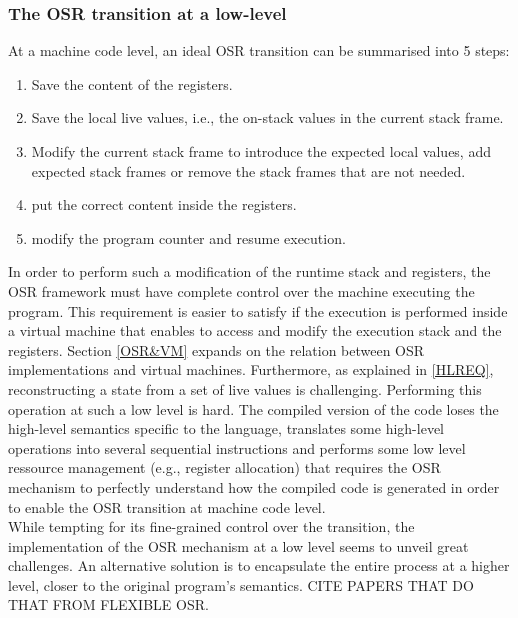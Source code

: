 \subsubsection{The OSR transition at a low-level}
At a machine code level, an ideal OSR transition can be summarised into 5 steps: 
\begin{enumerate}
    \item Save the content of the registers.
    \item Save the local live values, i.e., the on-stack values in the current stack frame.
    \item Modify the current stack frame to introduce the expected local values, add expected stack frames or remove the stack frames that are not needed.
    \item put the correct content inside the registers.
    \item modify the program counter and resume execution.
\end{enumerate}
In order to perform such a modification of the runtime stack and registers, the OSR framework must have complete control over the machine executing the program.
This requirement is easier to satisfy if the execution is performed inside a virtual machine that enables to access and modify the execution stack and the registers.
Section \ref{OSR&VM} expands on the relation between OSR implementations and virtual machines.
Furthermore, as explained in \ref{HLREQ}, reconstructing a state from a set of live values is challenging. 
Performing this operation at such a low level is hard.
The compiled version of the code loses the high-level semantics specific to the language, translates some high-level operations into several sequential instructions and performs some low level ressource management (e.g., register allocation) that requires the OSR mechanism to perfectly understand how the compiled code is generated in order to enable the OSR transition at machine code level.\\

While tempting for its fine-grained control over the transition, the implementation of the OSR mechanism at a low level seems to unveil great challenges.
An alternative solution is to encapsulate the entire process at a higher level, closer to the original program's semantics.
CITE PAPERS THAT DO THAT FROM FLEXIBLE OSR.

